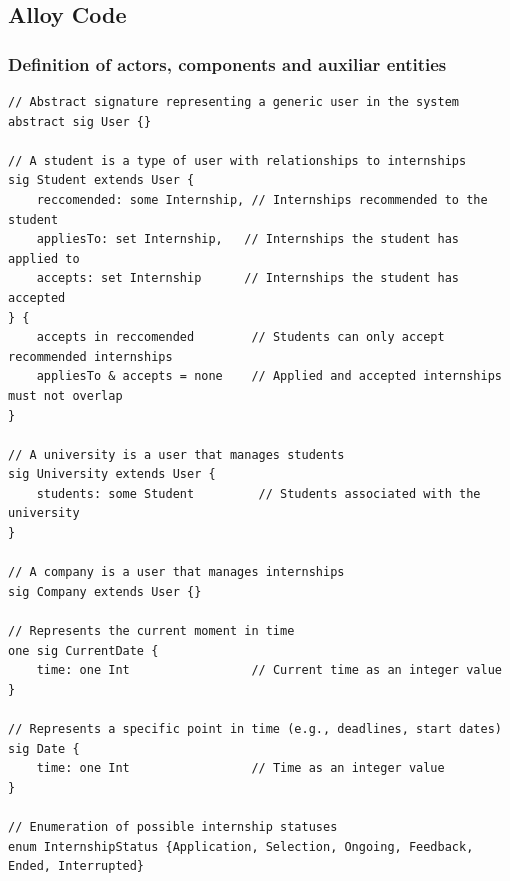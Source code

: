 \documentclass{article}
\begin{document}
\subsection{Alloy Code}

\subsubsection{Definition of actors, components and auxiliar entities}
\begin{lstlisting}
// Abstract signature representing a generic user in the system
abstract sig User {}

// A student is a type of user with relationships to internships
sig Student extends User {
    reccomended: some Internship, // Internships recommended to the student
    appliesTo: set Internship,   // Internships the student has applied to
    accepts: set Internship      // Internships the student has accepted
} {
    accepts in reccomended        // Students can only accept recommended internships
    appliesTo & accepts = none    // Applied and accepted internships must not overlap
}

// A university is a user that manages students
sig University extends User {
    students: some Student         // Students associated with the university
}

// A company is a user that manages internships
sig Company extends User {}

// Represents the current moment in time
one sig CurrentDate {
    time: one Int                 // Current time as an integer value
}

// Represents a specific point in time (e.g., deadlines, start dates)
sig Date {
    time: one Int                 // Time as an integer value
}

// Enumeration of possible internship statuses
enum InternshipStatus {Application, Selection, Ongoing, Feedback, Ended, Interrupted}


\end{lstlisting}
\end{document}
